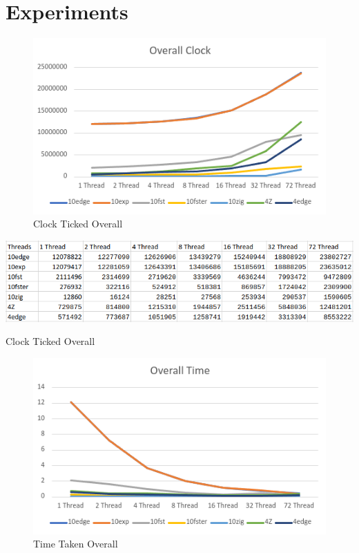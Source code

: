 \documentclass{article}
\begin{document}
\section*{Experiments}
\begin{figure}[!htb]
\includegraphics[width=\textwidth]{overall-clock.png}
\caption{Clock Ticked Overall}
\label{fig:1}
\end{figure}

\begin{table}[!htb]
\includegraphics[width=\textwidth]{overall-clock-table.png}
\caption{Clock Ticked Overall}
\label{tab:1}
\end{table}

\begin{figure}[!htb]
\includegraphics[width=\textwidth]{overall-time.png}
\caption{Time Taken Overall}
\label{fig:2}
\end{figure}
\end{document}
